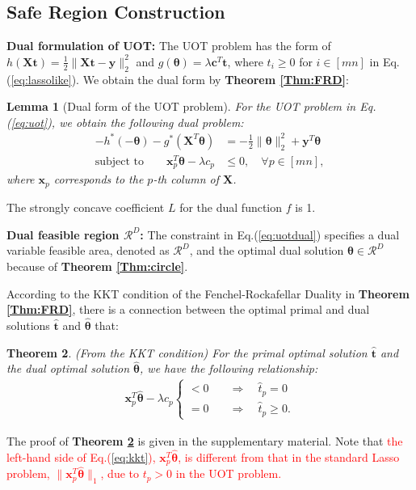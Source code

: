 \documentclass[twoside]{article}
\theoremstyle{plain}
\newtheorem{thm}{Theorem}
\newtheorem{lem}[thm]{Lemma}
\newcommand{\R}{\mathbb{R}}
\newcommand{\mat}[1]{\mathbf{#1}}
\renewcommand{\vec}[1]{\bm{#1}}
\newcommand{\changeHK}[1]{\textcolor{red}{#1}}
\begin{document}
\subsection{Safe Region Construction}

{\bf Dual formulation of UOT:} The UOT problem has the form of
$h(\mat{X} \vec{t}) = \frac{1}{2}\|\mat{X} \vec{t}-\vec{y}\|_2^2$ and $g(\vec{\theta})=\lambda \vec{c}^{T}\vec{t}$, where $t_i \geq 0$ for $i \in [mn]$ in Eq.(\ref{eq:lassolike}). 
We obtain the dual form by {\bf Theorem \ref{Thm:FRD}}:
\begin{lem}[Dual form of the UOT problem]
For the UOT problem in Eq.(\ref{eq:uot}), we obtain the following dual problem:
\begin{equation}
\begin{split}
-h^*(-\vec{\theta}) - g^*(\mat{X}^T\vec{\theta})& = -\frac{1}{2}\|\vec{\theta}\|_2^2+\vec{y}^T\vec{\theta} \\
\text{subject\ to} \quad \quad \vec{x}_p^T\vec{\theta} -\lambda c_p &\leq 0, \quad \forall p \in [mn],
\end{split}
\label{eq:uotdual}
\end{equation}
where $\vec{x}_p $ corresponds to the $p$-th column of $\mat{X}$.
\end{lem}
The strongly concave coefficient $L$ for the dual function $f$ is 1. 

{\bf Dual feasible region $\mathcal{R}^D$:} 
The constraint in Eq.(\ref{eq:uotdual}) specifies a dual variable feasible area, denoted as $\mathcal{R}^{D}$, and the optimal dual solution $\hat{\vec{\theta}} \in \mathcal{R}^{D}$ because of {\bf Theorem \ref{Thm:circle}}.

According to the KKT condition of the Fenchel-Rockafellar Duality in {\bf Theorem \ref{Thm:FRD}}, there is a connection between the optimal primal and dual solutions $ \hat{\vec{t}}$ and $\hat{\vec{\theta}}$ that:
\begin{thm}(From the KKT condition) For the primal optimal solution $\hat{\vec{t}}$ and the dual optimal solution $\hat{\vec{\theta}}$, we have the following relationship:
\label{Thm:KKT}
 \begin{equation}
 \label{eq:kkt}
\begin{split}
\vec{x}_p^T\hat{\vec{\theta}} -\lambda c_p \left\{
\begin{aligned}
< 0 \quad& \Longrightarrow \quad\hat{t}_p = 0\\
= 0 \quad& \Longrightarrow \quad\hat{t}_p \geq 0.
\end{aligned}
\right.
 \end{split}
\end{equation}
\end{thm}
The proof of {\bf Theorem \ref{Thm:KKT}} is given in the supplementary material. Note that \changeHK{the left-hand side of Eq.(\ref{eq:kkt}), $\vec{x}_p^T\hat{\vec{\theta}} $,  is different from that in the standard Lasso problem, $\|\vec{x}_p^T\hat{\vec{\theta}} \|_1$,  due to $t_p > 0$ in the UOT problem.}
\end{document}
